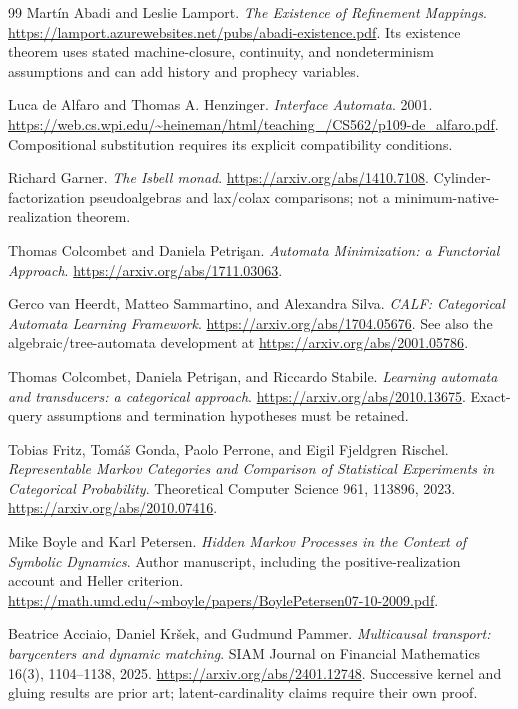 \documentclass[11pt]{article}
\theoremstyle{remark}
\begin{document}
\begin{thebibliography}{99}
Mart\'in Abadi and Leslie Lamport.
\emph{The Existence of Refinement Mappings}.
\url{https://lamport.azurewebsites.net/pubs/abadi-existence.pdf}.
Its existence theorem uses stated machine-closure, continuity, and nondeterminism assumptions and can add history and prophecy variables.

Luca de Alfaro and Thomas A. Henzinger.
\emph{Interface Automata}. 2001.
\url{https://web.cs.wpi.edu/~heineman/html/teaching_/CS562/p109-de_alfaro.pdf}.
Compositional substitution requires its explicit compatibility conditions.

Richard Garner. \emph{The Isbell monad}.
\url{https://arxiv.org/abs/1410.7108}.
Cylinder-factorization pseudoalgebras and lax/colax comparisons; not a minimum-native-realization theorem.

Thomas Colcombet and Daniela Petri\c{s}an.
\emph{Automata Minimization: a Functorial Approach}.
\url{https://arxiv.org/abs/1711.03063}.

Gerco van Heerdt, Matteo Sammartino, and Alexandra Silva.
\emph{CALF: Categorical Automata Learning Framework}.
\url{https://arxiv.org/abs/1704.05676}.
See also the algebraic/tree-automata development at
\url{https://arxiv.org/abs/2001.05786}.

Thomas Colcombet, Daniela Petri\c{s}an, and Riccardo Stabile.
\emph{Learning automata and transducers: a categorical approach}.
\url{https://arxiv.org/abs/2010.13675}.
Exact-query assumptions and termination hypotheses must be retained.

Tobias Fritz, Tom\'a\v{s} Gonda, Paolo Perrone, and Eigil Fjeldgren Rischel.
\emph{Representable Markov Categories and Comparison of Statistical Experiments in Categorical Probability}.
Theoretical Computer Science 961, 113896, 2023.
\url{https://arxiv.org/abs/2010.07416}.

Mike Boyle and Karl Petersen.
\emph{Hidden Markov Processes in the Context of Symbolic Dynamics}.
Author manuscript, including the positive-realization account and Heller criterion.
\url{https://math.umd.edu/~mboyle/papers/BoylePetersen07-10-2009.pdf}.

Beatrice Acciaio, Daniel Kr\v{s}ek, and Gudmund Pammer.
\emph{Multicausal transport: barycenters and dynamic matching}.
SIAM Journal on Financial Mathematics 16(3), 1104--1138, 2025.
\url{https://arxiv.org/abs/2401.12748}.
Successive kernel and gluing results are prior art; latent-cardinality claims require their own proof.


\end{thebibliography}
\end{document}
